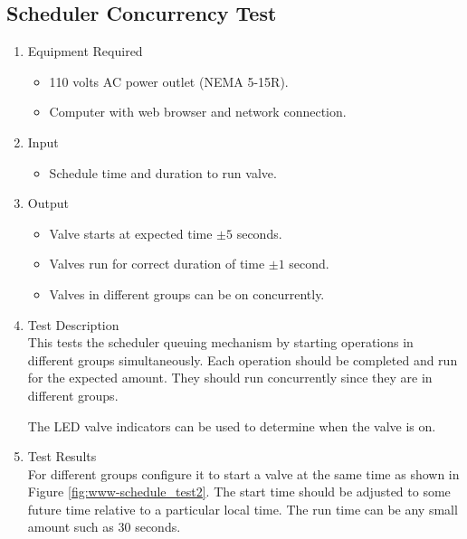 \documentclass{article}
\begin{document}

\clearpage
\subsection{Scheduler Concurrency Test}

\begin{enumerate}
\item Equipment Required
	\begin{itemize}
	\item 110 volts AC power outlet (NEMA 5-15R).
	\item Computer with web browser and network connection.
	\end{itemize}
\item Input
	\begin{itemize}
	\item Schedule time and duration to run valve.
	\end{itemize}
\item Output
	\begin{itemize}
	\item Valve starts at expected time $\pm5$ seconds.
	\item Valves run for correct duration of time $\pm1$ second.
	\item Valves in different groups can be on concurrently.
	\end{itemize}

\item Test Description \\

This tests the scheduler queuing mechanism by starting
operations in different groups simultaneously.
Each operation should be completed and run for the expected amount.
They should run concurrently since they are in different groups.

The LED valve indicators can be used to determine when the valve is on.

\pagebreak
\item Test Results \\
	\vspace{1em}
	For different groups configure it to start a valve 
	at the same time as shown in Figure \ref{fig:www-schedule_test2}.
	The start time should be adjusted to some future time relative
	to a particular local time.
	The run time can be any small amount such as 30 seconds. \\


\end{enumerate}
\end{document}
